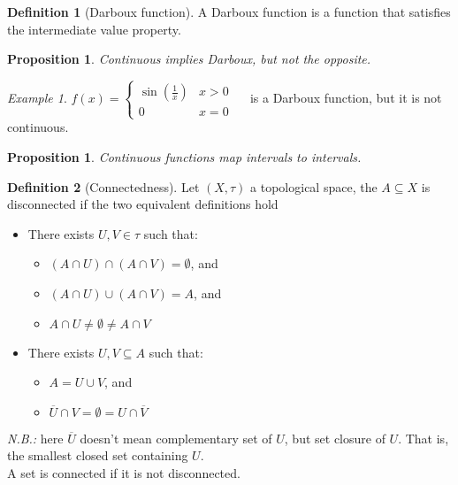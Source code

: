 \documentclass{article}
\theoremstyle{definition}
\newtheorem{definition}{Definition}[section]
\theoremstyle{definition}
\theoremstyle{plain}
\theoremstyle{plain}
\theoremstyle{plain}
\theoremstyle{plain}
\newtheorem{proposition}[theorem]{Proposition}
\theoremstyle{definition}
\theoremstyle{remark}
\theoremstyle{remark}
\theoremstyle{remark}
\newtheorem{examplet}{Example}[theorem]
\theoremstyle{remark}
\begin{document}
\begin{definition}[Darboux function]
  A Darboux function is a function that satisfies the intermediate value property.
\end{definition}


\begin{proposition}
  Continuous implies Darboux, but not the opposite.
\end{proposition}

\begin{examplet}
  $f(x) = \begin{cases}\sin(\frac{1}{x}) & x > 0 \\ 0 & x = 0\end{cases} \quad$ is a Darboux function, but it is not continuous.
\end{examplet}


\begin{proposition}
  Continuous functions map intervals to intervals.
\end{proposition}


\begin{definition}[Connectedness]
  Let $(X, \tau)$ a topological space, the $A \subseteq X$ is disconnected if the two equivalent definitions hold
  \begin{itemize}
    \item There exists $U, V \in \tau$ such that:
    \begin{itemize}
      \item $(A \cap U) \cap (A \cap V) = \emptyset$, and
      \item $(A \cap U) \cup (A \cap V) = A$, and
      \item $A \cap U \neq \emptyset \neq A \cap V$
    \end{itemize}
    \item There exists $U, V \subseteq A$ such that:
    \begin{itemize}
      \item $A = U \cup V$, and
      \item $\overline{U} \cap V = \emptyset = U \cap \overline{V}$
    \end{itemize}
  \end{itemize}
  \textit{N.B.:} here $\overline{U}$ doesn't mean complementary set of $U$, but set closure of $U$. That is, the smallest closed set containing $U$.\\
  A set is connected if it is not disconnected.
\end{definition}
\end{document}
